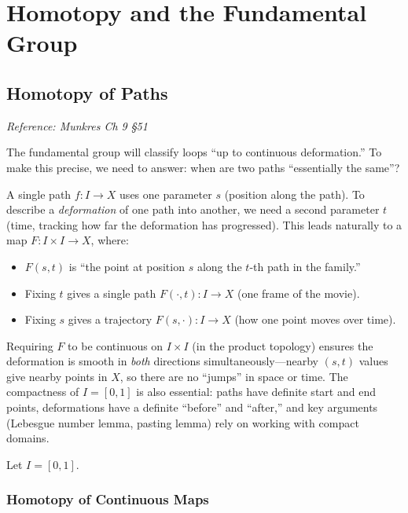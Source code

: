\documentclass[11pt]{report}
\begin{document}
\chapter{Homotopy and the Fundamental Group}

\section{Homotopy of Paths}

\textit{Reference: Munkres Ch 9 \S 51}

\begin{rembox}
The fundamental group will classify loops ``up to continuous deformation.'' To make this precise, we need to answer: when are two paths ``essentially the same''?

A single path $f: I \to X$ uses one parameter $s$ (position along the path). To describe a \emph{deformation} of one path into another, we need a second parameter $t$ (time, tracking how far the deformation has progressed). This leads naturally to a map $F: I \times I \to X$, where:
\begin{itemize}[nosep]
    \item $F(s, t)$ is ``the point at position $s$ along the $t$-th path in the family.''
    \item Fixing $t$ gives a single path $F(\cdot, t): I \to X$ (one frame of the movie).
    \item Fixing $s$ gives a trajectory $F(s, \cdot): I \to X$ (how one point moves over time).
\end{itemize}
Requiring $F$ to be continuous on $I \times I$ (in the product topology) ensures the deformation is smooth in \emph{both} directions simultaneously---nearby $(s, t)$ values give nearby points in $X$, so there are no ``jumps'' in space or time. The compactness of $I = [0,1]$ is also essential: paths have definite start and end points, deformations have a definite ``before'' and ``after,'' and key arguments (Lebesgue number lemma, pasting lemma) rely on working with compact domains.
\end{rembox}

Let $I = [0, 1]$.

\subsection{Homotopy of Continuous Maps}
\end{document}
